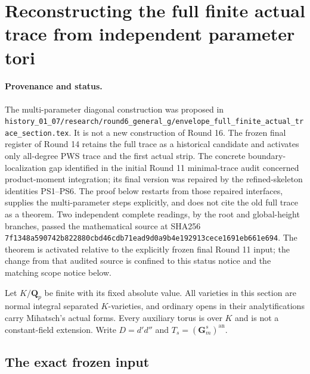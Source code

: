 \section{Reconstructing the full finite actual trace from independent parameter tori}
\label{r16ft:section}

\paragraph{Provenance and status.}
The multi-parameter diagonal construction was proposed in
\texttt{history\_01\_07/research/round6\_general\_g/envelope\_full\_finite\_actual\_trace\_section.tex}.
It is not a new construction of Round 16. The frozen final register of
Round 14 retains the full trace as a historical candidate and activates
only all-degree PWS trace and the first actual strip. The concrete
boundary-localization gap identified in the initial Round 11 minimal-trace
audit concerned product-moment integration; its final version was repaired
by the refined-skeleton identities PS1--PS6. The proof below restarts from
those repaired interfaces, supplies the multi-parameter steps explicitly,
and does not cite the old full trace as a theorem. Two independent complete
readings, by the root and global-height branches, passed the mathematical
source at SHA256
\texttt{7f1348a590742b822880cbd46cdb71ead9d0a9b4e192913cece1691eb661e694}.
The theorem is activated relative to the explicitly frozen final Round 11
input; the change from that audited source is confined to this status
notice and the matching scope notice below.

Let $K/\mathbf Q_p$ be finite with its fixed absolute value. All varieties
in this section are normal integral separated $K$-varieties, and ordinary
opens in their analytifications carry Mihatsch's actual forms. Every
auxiliary torus is over $K$ and is not a constant-field extension. Write
$D=d'd''$ and $T_s=(\mathbf G_m^s)^{\mathrm{an}}$.

\subsection{The exact frozen input}

